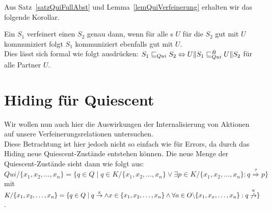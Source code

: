 Aus Satz~\ref{satzQuiFullAbst} und Lemma~\ref{lemQuiVerfeinerung} erhalten wir
das folgende Korollar.

\begin{kor}
  Ein \EIO{} $S_1$ verfeinert einen \EIO{} $S_2$ genau dann, wenn für alle
  \EIO{}s $U$ für die $S_2$ gut mit $U$ kommuniziert folgt $S_1$ kommuniziert
  ebenfalls gut mit $U$.\\
  Dies lässt sich formal wie folgt ausdrücken: $S_1\sqsubseteq _{Qui} S_2\Leftrightarrow
  U\|S_1\sqsubseteq _{Qui}^B U\|S_2$ für alle Partner $U$.
\end{kor}

\section{Hiding für Quiescent}

Wir wollen nun auch hier die Auswirkungen der Internalisierung von Aktionen auf
unsere Verfeinerungsrelationen untersuchen.\\
Diese Betrachtung ist hier jedoch nicht so einfach wie für Errors, da durch das
Hiding neue Quiescent-Zustände entstehen können. Die neue Menge der
Quiescent-Zustände sieht dann wie folgt aus: $Qui/\{x_1,x_2,\dots ,x_n\} =
\{q\in Q\mid q\in K/\{x_1,x_2,\dots ,x_n\}\vee \exists p\in K/\{x_1,x_2,\dots
,x_n\}:q \overset{\tau}{\Rightarrow} p\}$ mit
$K/\{x_1,x_2,\dots ,x_n\}=\{q\in Q\mid q \overset{x}{\rightarrow}\wedge x\in
\{x_1,x_2,\dots ,x_n\}\wedge \forall a\in O\backslash\{x_1,x_x,\dots ,x_n\}: q
\overset{a}{\not{\hspace{-0.1cm}\rightarrow}}\}$.


